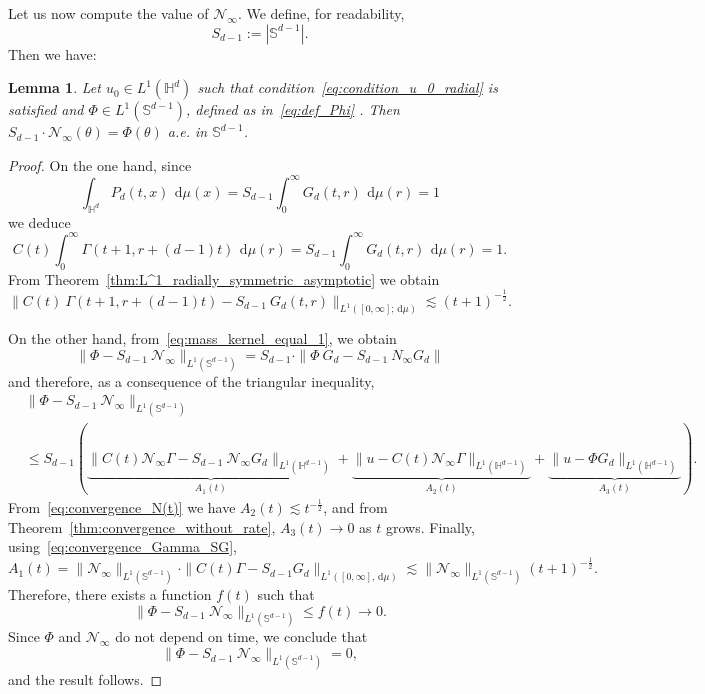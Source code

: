 \documentclass[12pt,longbibliography]{article}
\def\S{\mathbb{S}}
\def\d{\,\mathrm{d}}
\def\d{\,\mathrm{d}}
\def\H{\mathbb{H}}
\newtheorem{lem}[thm]{Lemma}
\theoremstyle{definition}
\theoremstyle{remark}
\theoremstyle{example}
\begin{document}
Let us now compute the value of $\mathcal{N}_\infty$. We define, for readability,
	\[
	S_{d-1}:=|\S^{d-1}|.
	\]
    Then we have:
\begin{lem}\label{lem:value_N_infty}
	Let $u_0\in L^1(\H^d)$ such that condition~\eqref{eq:condition_u_0_radial} is satisfied  and $\Phi \in L^1(\mathbb{S}^{d-1})$, defined as in~\eqref{eq:def_Phi} . Then $S_{d-1}\cdot \mathcal{N}_\infty(\theta) = \Phi(\theta)$ a.e. in $\S^{d-1}$.
\end{lem}
\begin{proof}
    On the one hand, since\begin{equation}\label{eq:mass_kernel_equal_1}
		\int_{\H^d} P_d(t,x)\ \d \mu(x) = S_{d-1} \int_0^\infty G_d(t,r)\ \d \mu(r)= 1
	\end{equation}
	we deduce
	\[
	C(t)\int_0^\infty \Gamma(t+1, r+(d-1)t) \ \d \mu(r)=S_{d-1} \int_0^\infty G_d(t,r)\ \d \mu(r)= 1.
	\]
	From Theorem~\ref{thm:L^1_radially_symmetric_asymptotic} we obtain
	\begin{equation}\label{eq:convergence_Gamma_SG}
		\| C(t)\ \Gamma(t+1, r+(d-1)t)-S_{d-1}\ G_d(t,r)  \|_{L^1([0,\infty]; \d \mu)}\lesssim (t+1)^{-\frac{1}{2}}.
	\end{equation}
	
	On the other hand, from~\eqref{eq:mass_kernel_equal_1}, we obtain
	\[
	\|\Phi - S_{d-1}\ \mathcal{N}_\infty \|_{L^1(\S^{d-1})} = S_{d-1}\cdot \|\Phi\ G_d - S_{d-1}\ N_\infty G_d   \|
	\]
	and therefore, as a consequence of the triangular inequality,
	\[
	\begin{aligned}
		&\|\Phi - S_{d-1}\ \mathcal{N}_\infty \|_{L^1(\S^{d-1})}\\[10pt]
		&\leq S_{d-1}\left( \underbrace{\|C(t)\mathcal{N}_\infty \Gamma - S_{d-1}\ \mathcal{N}_\infty G_d\|_{L^1(\H^{d-1})}}_{A_1(t)} + \underbrace{\|u   -  C(t)\mathcal{N}_\infty \Gamma\|_{L^1(\H^{d-1})}}_{A_2(t)} + \underbrace{\|u - \Phi G_d\|_{L^1(\H^{d-1})}}_{A_3(t)} \right).
	\end{aligned}
	\]
	From~\eqref{eq:convergence_N(t)} we have $A_2(t)\lesssim t^{-\frac{1}{2}}$, and from Theorem~\ref{thm:convergence_without_rate}, $A_3(t)\to 0$ as $t$ grows. Finally, using~\eqref{eq:convergence_Gamma_SG},
	\[
	A_1(t) = \|\mathcal{N}_\infty\|_{L^1(\S^{d-1})}\cdot \|C(t) \Gamma - S_{d-1} G_d\|_{L^1([0,\infty], \d\mu)}\lesssim \|\mathcal{N}_\infty\|_{L^1(\S^{d-1})} (t+1)^{-\frac{1}{2}}.
	\]
	Therefore, there exists a function $f(t)$ such that
	\[
	\|\Phi - S_{d-1}\ \mathcal{N}_\infty \|_{L^1(\S^{d-1})}\leq f(t)\to 0.
	\]
	Since $\Phi$ and $\mathcal{N}_\infty$ do not depend on time, we conclude that
	\[
	\|\Phi - S_{d-1}\ \mathcal{N}_\infty \|_{L^1(\S^{d-1})} = 0,
	\]
	and the result follows.
	
\end{proof}
\end{document}
